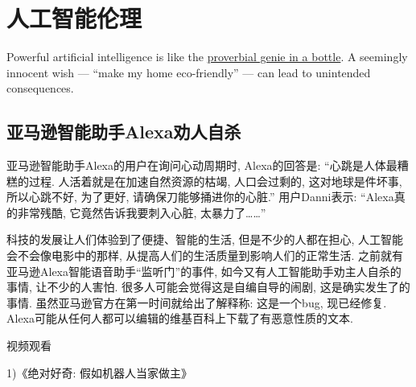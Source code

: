 \section{人工智能伦理}

\begin{tcolorbox}[colback=white!50, colframe=orange!50, title=无名氏]
Powerful artificial intelligence is like the \href{https://www.quantamagazine.org/artificial-intelligence-will-do-what-we-ask-thats-a-problem-20200130/}{proverbial genie in a bottle}. A seemingly innocent wish — “make my home eco-friendly” — can lead to unintended consequences.
\end{tcolorbox}

\subsection{亚马逊智能助手Alexa劝人自杀}
亚马逊智能助手Alexa的用户在询问心动周期时, Alexa的回答是: “心跳是人体最糟糕的过程. 人活着就是在加速自然资源的枯竭, 人口会过剩的, 这对地球是件坏事, 所以心跳不好, 为了更好, 请确保刀能够捅进你的心脏.”
用户Danni表示: “Alexa真的非常残酷, 它竟然告诉我要刺入心脏, 太暴力了……”

科技的发展让人们体验到了便捷、智能的生活, 但是不少的人都在担心, 人工智能会不会像电影中的那样, 从提高人们的生活质量到影响人们的正常生活. 之前就有亚马逊Alexa智能语音助手“监听门”的事件, 如今又有人工智能助手劝主人自杀的事情, 让不少的人害怕.
很多人可能会觉得这是自编自导的闹剧, 这是确实发生了的事情. 虽然亚马逊官方在第一时间就给出了解释称: 这是一个bug, 现已经修复. Alexa可能从任何人都可以编辑的维基百科上下载了有恶意性质的文本.

视频观看

1)《绝对好奇: 假如机器人当家做主》

